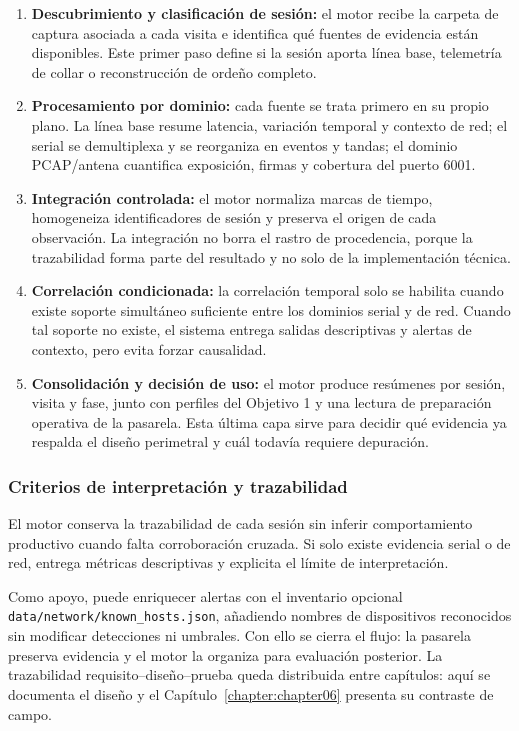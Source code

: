 \begin{enumerate}
    \item \textbf{Descubrimiento y clasificación de sesión:} el motor recibe la carpeta de captura asociada a cada visita e identifica qué fuentes de evidencia están disponibles. Este primer paso define si la sesión aporta línea base, telemetría de collar o reconstrucción de ordeño completo.
    \item \textbf{Procesamiento por dominio:} cada fuente se trata primero en su propio plano. La línea base resume latencia, variación temporal y contexto de red; el serial se demultiplexa y se reorganiza en eventos y tandas; el dominio \ac{PCAP}/antena cuantifica exposición, firmas y cobertura del puerto 6001.
    \item \textbf{Integración controlada:} el motor normaliza marcas de tiempo, homogeneiza identificadores de sesión y preserva el origen de cada observación. La integración no borra el rastro de procedencia, porque la trazabilidad forma parte del resultado y no solo de la implementación técnica.
    \item \textbf{Correlación condicionada:} la correlación temporal solo se habilita cuando existe soporte simultáneo suficiente entre los dominios serial y de red. Cuando tal soporte no existe, el sistema entrega salidas descriptivas y alertas de contexto, pero evita forzar causalidad.
    \item \textbf{Consolidación y decisión de uso:} el motor produce resúmenes por sesión, visita y fase, junto con perfiles del Objetivo 1 y una lectura de preparación operativa de la pasarela. Esta última capa sirve para decidir qué evidencia ya respalda el diseño perimetral y cuál todavía requiere depuración.
\end{enumerate}

\subsubsection{Criterios de interpretación y trazabilidad}
El motor conserva la trazabilidad de cada sesión sin inferir comportamiento productivo cuando falta corroboración cruzada. Si solo existe evidencia serial o de red, entrega métricas descriptivas y explicita el límite de interpretación.

Como apoyo, puede enriquecer alertas con el inventario opcional \texttt{data/network/known\_hosts.json}, añadiendo nombres de dispositivos reconocidos sin modificar detecciones ni umbrales. Con ello se cierra el flujo: la pasarela preserva evidencia y el motor la organiza para evaluación posterior. La trazabilidad requisito--diseño--prueba queda distribuida entre capítulos: aquí se documenta el diseño y el Capítulo~\ref{chapter:chapter06} presenta su contraste de campo.
